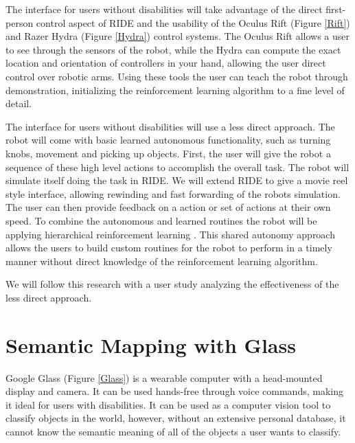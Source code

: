 \documentclass{aamas2014}
\begin{document}
The interface for users without disabilities will take advantage of the direct first-person control aspect of RIDE and the usability of the Oculus Rift (Figure \ref{Rift}) and Razer Hydra (Figure \ref{Hydra}) control systems. The Oculus Rift allows a user to see through the sensors of the robot, while the Hydra can compute the exact location and orientation of controllers in your hand, allowing the user direct control over robotic arms. Using these tools the user can teach the robot through demonstration, initializing the reinforcement learning algorithm to a fine level of detail.

The interface for users without disabilities will use a less direct approach. The robot will come with basic learned autonomous functionality, such as turning knobs, movement and picking up objects. First, the user will give the robot a sequence of these high level actions to accomplish the overall task. The robot will simulate itself doing the task in RIDE. We will extend RIDE to give a movie reel style interface, allowing rewinding and fast forwarding of the robots simulation. The user can then provide feedback on a action or set of actions at their own speed. To combine the autonomous and learned routines the robot will be applying hierarchical reinforcement learning  \cite{Barto:2003:RAH:608557.608576}. This shared autonomy approach allows the users to build custom routines for the robot to perform in a timely manner without direct knowledge of the reinforcement learning algorithm.

We will follow this research with a user study analyzing the effectiveness of the less direct approach.


\section{Semantic Mapping with Glass}
\label{Object Classification}
Google Glass (Figure \ref{Glass}) is a wearable computer with a head-mounted display and camera. It can be used hands-free through voice commands, making it ideal for users with disabilities. It can be used as a computer vision tool to classify objects in the world, however, without an extensive personal database, it cannot know the semantic meaning of all of the objects a user wants to classify. 
\end{document}
